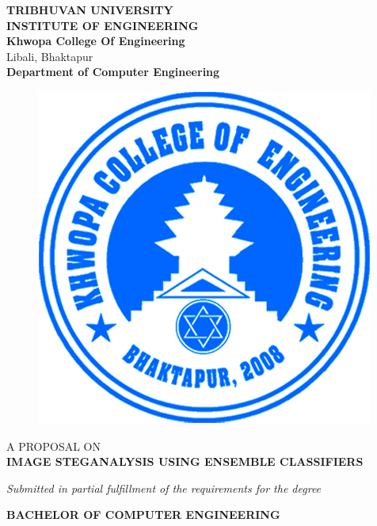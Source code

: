 \begin{center}
    \thispagestyle{empty}
    \Large\textbf{TRIBHUVAN UNIVERSITY}\\
    \Large\textbf{INSTITUTE OF ENGINEERING }\\
    \vspace{0.2in}
    \large{\textbf{Khwopa College Of Engineering}\\}
    \normalsize{Libali, Bhaktapur\\}
    \large\textbf{Department of Computer Engineering}
    \vspace{0.2in}
    \begin{figure}[h]
        \centering
            \includegraphics{img/Khwopalogo.jpg}
    \end{figure}
    
    \vspace{0.2in}
    \large{A PROPOSAL ON\\\textbf{IMAGE STEGANALYSIS USING ENSEMBLE CLASSIFIERS}\\}

    \vspace{0.2in}
    \large{\textit{Submitted in partial fulfillment of the requirements for the degree\\}}
    
    \vspace{0.2in}
    \large{\textbf{BACHELOR OF COMPUTER ENGINEERING}\\}
    

\end{center}
